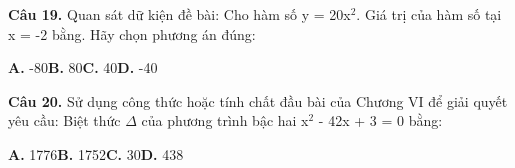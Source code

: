 \documentclass[11pt,a4paper]{article}
\begin{document}
\textbf{\color{primary} Câu 19.} Quan sát dữ kiện đề bài: Cho hàm số y = 20x$^2$. Giá trị của hàm số tại x = -2 bằng. Hãy chọn phương án đúng:\par
\hspace*{1.5em}\textbf{A.} -80\quad\quad \textbf{B.} 80\quad\quad \textbf{C.} 40\quad\quad \textbf{D.} -40\par\vspace{2pt}
\textbf{\color{primary} Câu 20.} Sử dụng công thức hoặc tính chất đầu bài của Chương VI để giải quyết yêu cầu: Biệt thức $\Delta$ của phương trình bậc hai x$^2$ - 42x + 3 = 0 bằng:\par
\hspace*{1.5em}\textbf{A.} 1776\quad\quad \textbf{B.} 1752\quad\quad \textbf{C.} 30\quad\quad \textbf{D.} 438\par\vspace{2pt}
\end{document}
